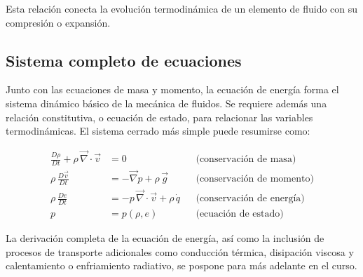 Esta relación conecta la evolución termodinámica de un elemento de fluido con su compresión o expansión.

\subsection{Sistema completo de ecuaciones}

Junto con las ecuaciones de masa y momento, la ecuación de energía forma el sistema dinámico básico de la mecánica de fluidos. Se requiere además una relación constitutiva, o ecuación de estado, para relacionar las variables termodinámicas. El sistema cerrado más simple puede resumirse como:

\begin{align*}
\frac{D\rho}{Dt} + \rho\,\vec{\nabla}\cdot\vec{v} &= 0 && \text{(conservación de masa)} \\[6pt]
\rho\,\frac{D\vec{v}}{Dt} &= -\vec{\nabla} p + \rho\,\vec{g} && \text{(conservación de momento)} \\[6pt]
\rho\,\frac{De}{Dt} &= -p\,\vec{\nabla}\cdot\vec{v} + \rho\,\dot{q} && \text{(conservación de energía)} \\[6pt]
p &= p(\rho, e) && \text{(ecuación de estado)}
\end{align*}

La derivación completa de la ecuación de energía, así como la inclusión de procesos de transporte adicionales como conducción térmica, disipación viscosa y calentamiento o enfriamiento radiativo, se pospone para más adelante en el curso.